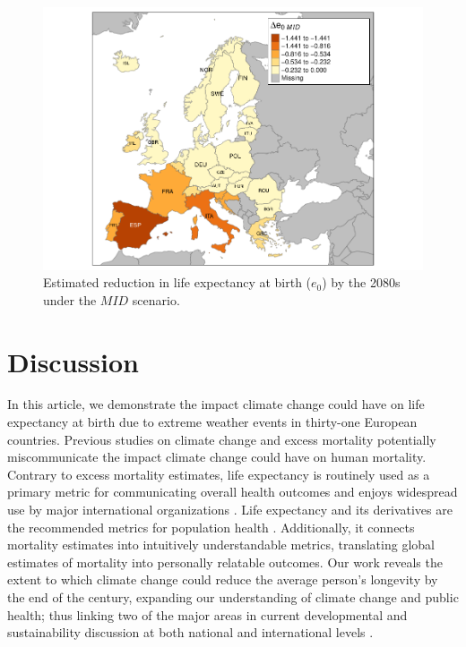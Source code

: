 \documentclass[12pt]{article}
\begin{document}
\begin{figure}
\centering
\includegraphics{MANUSCRIPT_files/figure-latex/figure-map-1.pdf}
\caption{Estimated reduction in life expectancy at birth (\(e_0\)) by
the 2080s under the \(MID\) scenario.\label{map}}
\end{figure}

\hypertarget{discussion}{%
\section{Discussion}\label{discussion}}

In this article, we demonstrate the impact climate change could have on
life expectancy at birth due to extreme weather events in thirty-one
European countries. Previous studies on climate change and excess
mortality potentially miscommunicate the impact climate change could
have on human mortality. Contrary to excess mortality estimates, life
expectancy is routinely used as a primary metric for communicating
overall health outcomes and enjoys widespread use by major international
organizations
\citep{world2015world, marmot2012building, salomon2012healthy}. Life
expectancy and its derivatives are the recommended metrics for
population health \citep{parrish2010peer}. Additionally, it connects
mortality estimates into intuitively understandable metrics, translating
global estimates of mortality into personally relatable outcomes. Our
work reveals the extent to which climate change could reduce the average
person's longevity by the end of the century, expanding our
understanding of climate change and public health; thus linking two of
the major areas in current developmental and sustainability discussion
at both national and international levels \citep{abel2016meeting}.
\end{document}
